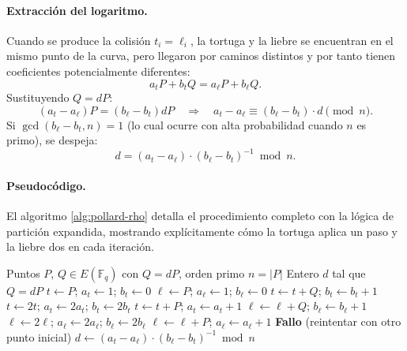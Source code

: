\paragraph{Extracción del logaritmo.}
Cuando se produce la colisión $t_i = \ell_i$, la tortuga y la liebre se encuentran en el mismo punto de la curva, pero llegaron por caminos distintos y por tanto tienen coeficientes potencialmente diferentes:
\[
    a_t P + b_t Q = a_\ell P + b_\ell Q.
\]
Sustituyendo $Q = dP$:
\[
    (a_t - a_\ell)P = (b_\ell - b_t) d P
    \quad\Longrightarrow\quad
    a_t - a_\ell \equiv (b_\ell - b_t) \cdot d \pmod{n}.
\]
Si $\gcd(b_\ell - b_t, n) = 1$ (lo cual ocurre con alta probabilidad cuando $n$ es primo), se despeja:
\begin{equation}
\label{eq:rho-recovery}
    d = (a_t - a_\ell) \cdot (b_\ell - b_t)^{-1} \bmod n.
\end{equation}


\paragraph{Pseudocódigo.}
El algoritmo \ref{alg:pollard-rho} detalla el procedimiento completo con la lógica de partición expandida, mostrando explícitamente cómo la tortuga aplica un paso y la liebre dos en cada iteración.

\begin{algorithm}[htbp]
\caption{Método $\rho$ de Pollard para el ECDLP}
\label{alg:pollard-rho}
\begin{algorithmic}[1]
\Require Puntos $P$, $Q \in E(\mathbb{F}_q)$ con $Q = dP$, orden primo $n = |P|$
\Ensure Entero $d$ tal que $Q = dP$
\State $t \leftarrow P$;\; $a_t \leftarrow 1$;\; $b_t \leftarrow 0$
\State $\ell \leftarrow P$;\; $a_\ell \leftarrow 1$;\; $b_\ell \leftarrow 0$
\Repeat
    \State {}
        \State $t \leftarrow t + Q$;\; $b_t \leftarrow b_t + 1$
        \State $t \leftarrow 2t$;\; $a_t \leftarrow 2a_t$;\; $b_t \leftarrow 2b_t$
    \Else
        \State $t \leftarrow t + P$;\; $a_t \leftarrow a_t + 1$
    \EndIf
    \State {}
            \State $\ell \leftarrow \ell + Q$;\; $b_\ell \leftarrow b_\ell + 1$
            \State $\ell \leftarrow 2\ell$;\; $a_\ell \leftarrow 2a_\ell$;\; $b_\ell \leftarrow 2b_\ell$
        \Else
            \State $\ell \leftarrow \ell + P$;\; $a_\ell \leftarrow a_\ell + 1$
        \EndIf
    \EndFor
    \State {}
    \State \Return \textbf{Fallo} (reintentar con otro punto inicial)
\Else
    \State \Return $d \leftarrow (a_t - a_\ell) \cdot (b_\ell - b_t)^{-1} \bmod n$
\EndIf
\end{algorithmic}
\end{algorithm}


